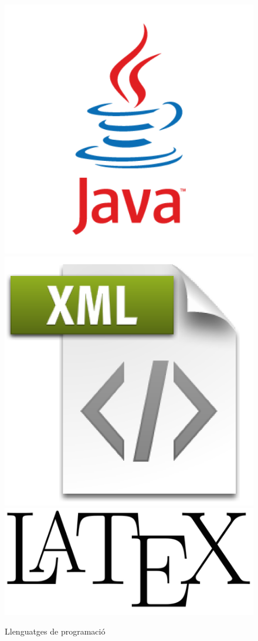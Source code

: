 \begin{figure}[H]
\centering
\includegraphics[scale=0.20]{Figures/java.png}
\includegraphics[scale=0.15]{Figures/xml.png}
\hspace{0.8cm}
\includegraphics[scale=0.20]{Figures/latex.png}
\caption{Llenguatges de programació}
\end{figure}

